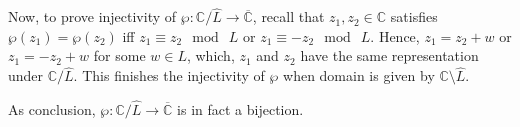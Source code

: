 \documentclass{article}
\begin{document}
\hfil

Now, to prove injectivity of $\wp:\mathbb{C}/\widehat{L}\rightarrow\overline{\mathbb{C}}$, recall that $z_1,z_2\in\mathbb{C}$ satisfies $\wp(z_1)=\wp(z_2)$ iff $z_1\equiv z_2\mod\ L$ or $z_1\equiv -z_2\mod\ L$.
Hence, $z_1 = z_2+w$ or $z_1=-z_2+w$ for some $w\in L$, which, $z_1$ and $z_2$ have the same representation under $\mathbb{C}/\widehat{L}$.
This finishes the injectivity of $\wp$ when domain is given by $\mathbb{C}\setminus \widehat{L}$.

\hfil

As conclusion, $\wp:\mathbb{C}/\widehat{L}\rightarrow\overline{\mathbb{C}}$ is in fact a bijection.
\end{document}
